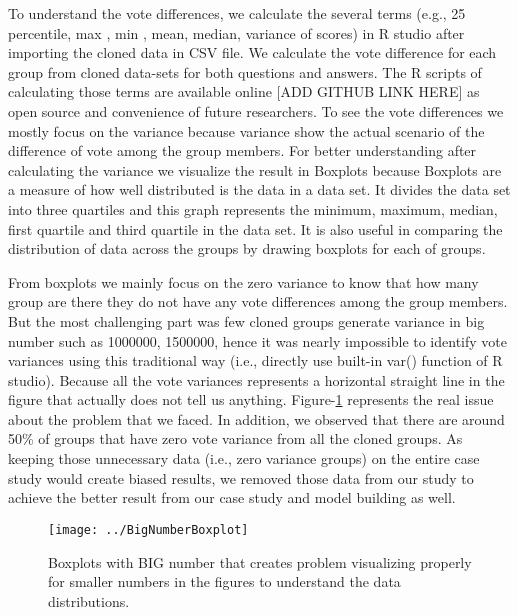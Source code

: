 \documentclass[conference]{IEEEtran}
\begin{document}
	To understand the vote differences, we calculate the several terms (e.g., 25 percentile, max , min , mean, median, variance of scores) in R studio after importing the cloned data in CSV file. We calculate the vote difference for each group from cloned data-sets for both questions and answers. The R scripts of calculating those terms are available online [ADD GITHUB LINK HERE] as open source and convenience of future researchers. To see the vote differences we mostly focus on the variance because variance show the actual scenario of the difference of vote among the group members. For better understanding after calculating the variance we visualize the result in Boxplots because Boxplots are a measure of how well distributed is the data in a data set. It divides the data set into three quartiles and this graph represents the minimum, maximum, median, first quartile and third quartile in the data set. It is also useful in comparing the distribution of data across the groups by drawing boxplots for each of groups.  
	
	
	From boxplots we mainly focus on the zero variance to know that how many group are there they do not have any vote differences among the group members. But the most challenging part was few cloned groups generate variance in big number such as 1000000, 1500000, hence it was nearly impossible to identify vote variances using this traditional way (i.e., directly use built-in var() function of R studio). Because all the vote variances represents a horizontal straight line in the figure that actually does not tell us anything. Figure-\ref{fig:bignumberboxplot} represents the real issue about the problem that we faced. In addition, we observed that there are around 50\% of groups that have zero vote variance from all the cloned groups. As keeping those unnecessary data (i.e., zero variance groups) on the entire case study would create biased results, we removed those data from our study to achieve the better result from our case study and model building as well.
	
	\begin{figure}
		\centering
		\texttt{[image: ../BigNumberBoxplot]}
		\caption{Boxplots with BIG number that creates problem visualizing properly for smaller numbers in the figures to understand the data distributions.}
		\label{fig:bignumberboxplot}
	\end{figure}
	
\end{document}
